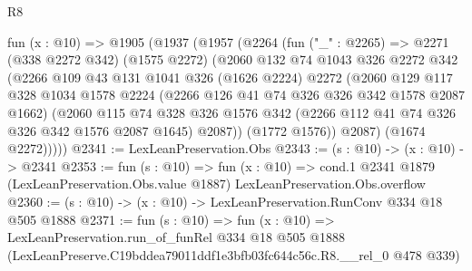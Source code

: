 \begin{lexlean}{R8}
\begin{coremodule}
  fun (x : @10) =>
  @1905
    (@1937
      (@1957
        (@2264
          (fun ("_" : @2265) =>
          @2271
            (@338 @2272 @342)
            (@1575 @2272)
            (@2060
              @132
              @74
              @1043
              @326
              @2272
              @342
              (@2266
                @109
                @43
                @131
                @1041
                @326
                (@1626 @2224)
                @2272
                (@2060
                  @129
                  @117
                  @328
                  @1034
                  @1578
                  @2224
                  (@2266 @126 @41 @74 @326 @326 @342 @1578 @2087 @1662)
                  (@2060
                    @115
                    @74
                    @328
                    @326
                    @1576
                    @342
                    (@2266 @112 @41 @74 @326 @326 @342 @1576 @2087 @1645)
                    @2087))
                (@1772 @1576))
              @2087)
            (@1674 @2272)))))
@2341 := LexLeanPreservation.Obs
@2343 := (s : @10) -> (x : @10) -> @2341
@2353 := fun (s : @10) =>
  fun (x : @10) =>
  cond.{1} @2341 @1879 (LexLeanPreservation.Obs.value @1887) LexLeanPreservation.Obs.overflow
@2360 := (s : @10) -> (x : @10) -> LexLeanPreservation.RunConv @334 @18 @505 @1888
@2371 := fun (s : @10) =>
  fun (x : @10) =>
  LexLeanPreservation.run_of_funRel
    @334
    @18
    @505
    @1888
    (LexLeanPreserve.C19bddea79011ddf1e3bfb03fc644c56c.R8.__rel_0 @478 @339)
\end{coremodule}
\end{lexlean}
